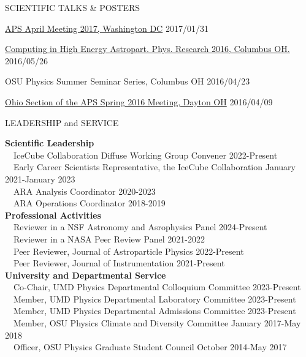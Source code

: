 \documentclass{resume} %
\begin{document}
\begin{rSection}{SCIENTIFIC TALKS \& POSTERS}
\begin{etaremune}
\item \href{http://meetings.aps.org/Meeting/APR17/Session/Y3.2}{APS April Meeting 2017, Washington DC} \hfill 2017/01/31
\item \href{http://ccapp.osu.edu/workshops/CHEAPR2016/workshop.html}{Computing in High Energy Astropart. Phys. Research 2016, Columbus OH.} \hfill 2016/05/26
\item OSU Physics Summer Seminar Series, Columbus OH \hfill 2016/04/23
\item \href{http://meetings.aps.org/Meeting/OSS16/Session/D3.6}{Ohio Section of the APS Spring 2016 Meeting, Dayton OH} \hfill 2016/04/09

\end{etaremune}
\end{rSection}
\newpage

\begin{rSection}{LEADERSHIP and SERVICE}

  \textbf{Scientific Leadership} \\
  \-\ \-\ IceCube Collaboration Diffuse Working Group Convener \hfill 2022-Present \\
  \-\ \-\ Early Career Scientists Representative, the IceCube Collaboration \hfill January 2021-January 2023 \\
  \-\ \-\ ARA Analysis Coordinator \hfill 2020-2023 \\
  \-\ \-\ ARA Operations Coordinator \hfill 2018-2019 \\

  \textbf{Professional Activities} \\
  \-\ \-\ Reviewer in a NSF Astronomy and Asrophysics Panel \hfill 2024-Present \\
  \-\ \-\ Reviewer in a NASA Peer Review Panel \hfill 2021-2022 \\
  \-\ \-\ Peer Reviewer, Journal of Astroparticle Physics \hfill 2022-Present \\
  \-\ \-\ Peer Reviewer, Journal of Instrumentation \hfill 2021-Present \\
  
  \textbf{University and Departmental Service} \\
  \-\ \-\ Co-Chair, UMD Physics Departmental Colloquium Committee \hfill 2023-Present \\
  \-\ \-\ Member, UMD Physics Departmental Laboratory Committee \hfill 2023-Present \\
  \-\ \-\ Member, UMD Physics Departmental Admissions Committee \hfill 2023-Present \\
  \-\ \-\ Member, OSU Physics Climate and Diversity Committee \hfill January 2017-May 2018\\
  \-\ \-\ Officer, OSU Physics Graduate Student Council \hfill October 2014-May 2017

\end{rSection}
\end{document}
